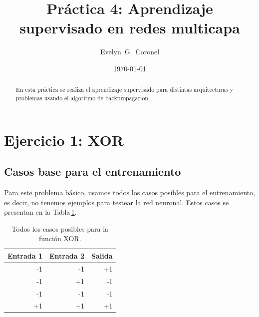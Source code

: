 



\title{Práctica 4: Aprendizaje supervisado en redes multicapa}
\author{Evelyn~G.~Coronel}


\date[]{\lowercase{\today}} %

\begin{abstract}
En esta práctica se realiza el aprendizaje supervisado para distintas arquitecturas y problemas usando el algoritmo de backpropagation.
\end{abstract} 
\maketitle
%

\section*{Ejercicio 1: XOR}

\subsection*{Casos base para el entrenamiento}

Para este problema básico, usamos todos los casos posibles para el entrenamiento, es decir, no tenemos ejemplos para testear la red neuronal. Estos casos se presentan en la Tabla\,\ref{tab:xor}.

\begin{table}[H]
\centering
\begin{tabular}{r | r | r}
Entrada 1 & Entrada 2 & Salida 	\\ \hline
-1 		  &-1	& +1 \\
-1 		  &+1	& -1\\
-1 		  &-1	& -1\\
+1 		  &+1	& +1\\
\end{tabular}
\caption{Todos los casos posibles para la función XOR.} \label{tab:xor}
\end{table}

